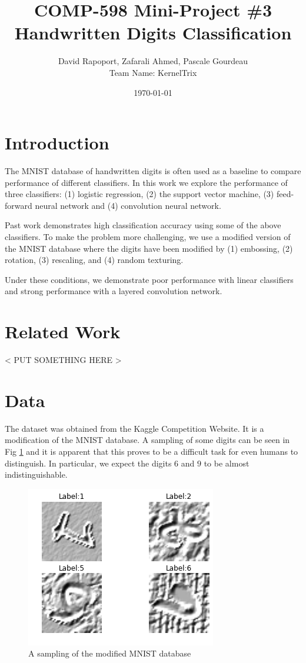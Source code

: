 \documentclass[conference]{IEEEtran}
\author{David Rapoport, Zafarali Ahmed, Pascale Gourdeau\\Team Name: KernelTrix}
\title{COMP-598 Mini-Project \#3\\Handwritten Digits Classification}
\date{\today}
\begin{document}
\maketitle

\section{Introduction}
The MNIST database\cite{MNIST_Original} of handwritten digits is often used as a baseline to compare performance of different classifiers. In this work we explore the performance of three classifiers: (1) logistic regression, (2) the support vector machine, (3) feed-forward neural network and (4) convolution neural network. 

Past work \cite{MNIST_Original} demonstrates high classification accuracy using some of the above classifiers. To make the problem more challenging, we use a modified version of the MNIST database where the digits have been modified by (1) embossing, (2) rotation, (3) rescaling, and (4) random texturing.

Under these conditions, we demonstrate poor performance with linear classifiers and strong performance with a layered convolution network.



\section{Related Work}
< PUT SOMETHING HERE >



\section{Data}
The dataset was obtained from the Kaggle Competition Website. It is a modification of the MNIST \cite{MNIST_Original} database. A sampling of some digits can be seen in Fig \ref{MNISTSample} and it is apparent that this proves to be a difficult task for even humans to distinguish. In particular, we expect the digits $6$ and $9$ to be almost indistinguishable.

\begin{figure}[h]
	\centering
	\includegraphics[scale=0.40]{sample_of_images.png}
	\caption{A sampling of the modified MNIST database}
	\label{MNISTSample}
\end{figure}
\end{document}

